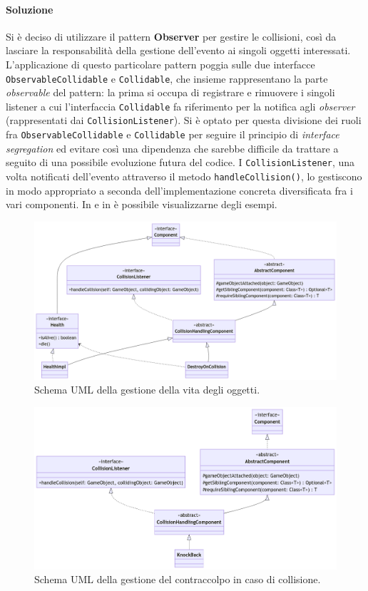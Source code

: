\documentclass[a4paper,12pt]{report}
\begin{document}
\paragraph*{Soluzione}
Si è deciso di utilizzare il pattern \textbf{Observer} per gestire le collisioni, così da lasciare la responsabilità della gestione dell'evento ai singoli oggetti interessati.
%
L'applicazione di questo particolare pattern poggia sulle due interfacce \texttt{ObservableCollidable} e \texttt{Collidable}, che insieme rappresentano la parte \textit{observable} del pattern: la prima si occupa di registrare e rimuovere i singoli listener a cui l'interfaccia \texttt{Collidable} fa riferimento per la notifica agli \textit{observer} (rappresentati dai \texttt{CollisionListener}).
Si è optato per questa divisione dei ruoli fra \texttt{ObservableCollidable} e \texttt{Collidable} per seguire il principio di \textit{interface segregation} ed evitare così una dipendenza che sarebbe difficile da trattare a seguito di una possibile evoluzione futura del codice. 
I \texttt{CollisionListener}, una volta notificati dell'evento attraverso il metodo \texttt{handleCollision()}, lo gestiscono in modo appropriato a seconda dell'implementazione concreta diversificata fra i vari componenti.
In  e in  è possibile visualizzarne degli esempi.
%
\begin{figure}[H]
    \centering{}
    \includegraphics[width=\textwidth]{img/Health.png}
    \caption{Schema UML della gestione della vita degli oggetti.}
    \label{fig:health}
\end{figure}
%
\begin{figure}[H]
    \centering{}
    \includegraphics[width=\textwidth]{img/KnockBack.png}
    \caption{Schema UML della gestione del contraccolpo in caso di collisione.}
    \label{fig:knock-back}
\end{figure}
\end{document}
